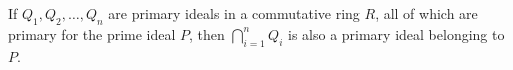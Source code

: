 If $Q_1, Q_2, \ldots, Q_n$ are primary ideals in a commutative ring $R$, all of which are primary for the prime ideal $P$, then $\bigcap_{i=1}^{n} Q_i$ is also a primary ideal belonging to $P$.
